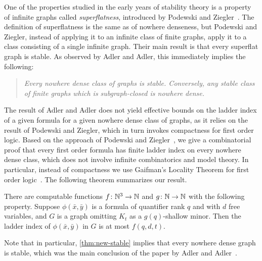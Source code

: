   
  One of the properties studied in the early 
  years of stability theory is 
  a property of infinite graphs  called \emph{superflatness}, introduced by Podewski and Ziegler~\cite{podewski1978stable}.
  The definition of superflatness is the same as   of nowhere denseness, but 
   Podewski and Ziegler,
  instead of applying it to an infinite class of finite graphs, apply it to a class consisting of a single infinite graph.
  Their main result is that every superflat graph is stable.   
As observed by Adler and Adler, 
this
 immediately implies  the following:
 \begin{quote}\itshape
 	Every nowhere dense class of graphs is stable. Conversely, any stable class of finite graphs which is subgraph-closed  is nowhere dense.
 \end{quote}
 The result of Adler and Adler 
 does not yield effective bounds on the 
 ladder index of a given formula for a given nowhere dense class of graphs, as it relies on the result of Podewski and Ziegler, which in turn invokes compactness for first order logic.
Based on the approach of Podewski and Ziegler~\cite{podewski1978stable}, we give a combinatorial 
proof that every first order formula has finite ladder index on every
nowhere dense class, which does not involve infinite combinatorics and model theory.
In particular, instead of compactness we use Gaifman's Locality Theorem for
first order logic~\cite{gaifman1982local}. The following theorem summarizes our result.

\begin{theorem}\label{thm:new-stable}
  There are computable functions $f\colon \mathbb{N}^3\to\mathbb{N}$ and $g\colon\mathbb{N}\to\mathbb{N}$ with the following property.
Suppose $\phi(\bar x,\bar y)$ is a formula of quantifier rank $q$ and with $d$ free variables,
and $G$ is a graph omitting $K_t$ as a $g(q)$-shallow minor. Then the ladder index of $\phi(\bar x,\bar y)$ in $G$ is at most $f(q,d,t)$.
\end{theorem}
Note that in particular, \cref{thm:new-stable} implies that every nowhere dense graph is stable, which was the main conclusion of the paper by Adler and Adler~\cite{adler2014interpreting}. 
 
 
